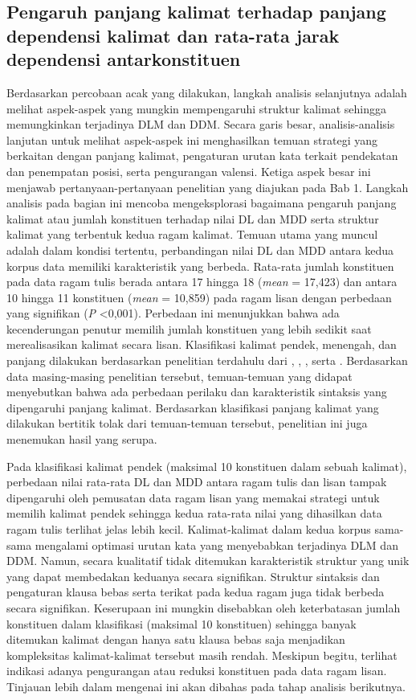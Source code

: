 \subsection{Pengaruh panjang kalimat terhadap panjang dependensi kalimat dan rata-rata jarak dependensi antarkonstituen}
Berdasarkan percobaan acak yang dilakukan, langkah analisis selanjutnya adalah melihat aspek-aspek yang mungkin mempengaruhi struktur kalimat sehingga memungkinkan terjadinya DLM dan DDM. Secara garis besar, analisis-analisis lanjutan untuk melihat aspek-aspek ini menghasilkan temuan strategi yang berkaitan dengan panjang kalimat, pengaturan urutan kata terkait pendekatan dan penempatan posisi, serta pengurangan valensi. Ketiga aspek besar ini menjawab pertanyaan-pertanyaan penelitian yang diajukan pada Bab 1. Langkah analisis pada bagian ini mencoba mengeksplorasi bagaimana pengaruh panjang kalimat atau jumlah konstituen terhadap nilai DL dan MDD serta struktur kalimat yang terbentuk kedua ragam kalimat. Temuan utama yang muncul adalah dalam kondisi tertentu, perbandingan nilai DL dan MDD antara kedua korpus data memiliki karakteristik yang berbeda. Rata-rata jumlah konstituen pada data ragam tulis berada antara 17 hingga 18 (\textit{mean} = 17,423) dan antara 10 hingga 11 konstituen (\textit{mean} = 10,859) pada ragam lisan dengan perbedaan yang signifikan (\textit{P} \textless 0,001). Perbedaan ini menunjukkan bahwa ada kecenderungan penutur memilih jumlah konstituen yang lebih sedikit saat merealisasikan kalimat secara lisan. Klasifikasi kalimat pendek, menengah, dan panjang dilakukan berdasarkan penelitian terdahulu dari \cite{gildea2015human}, \cite{futrell2015large}, \cite{wang2017effects}, serta \cite{liu2017dependency}. Berdasarkan data masing-masing penelitian tersebut, temuan-temuan yang didapat menyebutkan bahwa ada perbedaan perilaku dan karakteristik sintaksis yang dipengaruhi panjang kalimat. Berdasarkan klasifikasi panjang kalimat yang dilakukan bertitik tolak dari temuan-temuan tersebut, penelitian ini juga menemukan hasil yang serupa. 

Pada klasifikasi kalimat pendek (maksimal 10 konstituen dalam sebuah kalimat), perbedaan nilai rata-rata DL dan MDD antara ragam tulis dan lisan tampak dipengaruhi oleh pemusatan data ragam lisan yang memakai strategi untuk memilih kalimat pendek sehingga kedua rata-rata nilai yang dihasilkan data ragam tulis terlihat jelas lebih kecil. Kalimat-kalimat dalam kedua korpus sama-sama mengalami optimasi urutan kata yang menyebabkan terjadinya DLM dan DDM. Namun, secara kualitatif tidak ditemukan karakteristik struktur yang unik yang dapat membedakan keduanya secara signifikan. Struktur sintaksis dan pengaturan klausa bebas serta terikat pada kedua ragam juga tidak berbeda secara signifikan. Keserupaan ini mungkin disebabkan oleh keterbatasan jumlah konstituen dalam klasifikasi (maksimal 10 konstituen) sehingga banyak ditemukan kalimat dengan hanya satu klausa bebas saja menjadikan kompleksitas kalimat-kalimat tersebut masih rendah. Meskipun begitu, terlihat indikasi adanya pengurangan atau reduksi konstituen pada data ragam lisan. Tinjauan lebih dalam mengenai ini akan dibahas pada tahap analisis berikutnya.

